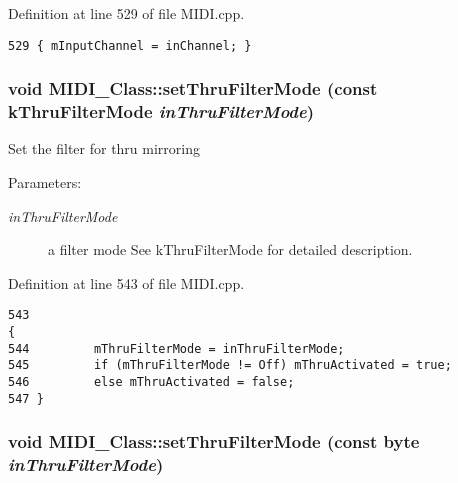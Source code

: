 Definition at line 529 of file MIDI.cpp.

\begin{Code}\begin{verbatim}529 { mInputChannel = inChannel; }
\end{verbatim}
\end{Code}


\hypertarget{class_m_i_d_i___class_33d450180a10a36bef08e68015c4d922}{
\subsubsection[{setThruFilterMode}]{\setlength{\rightskip}{0pt plus 5cm}void MIDI\_\-Class::setThruFilterMode (const {\bf kThruFilterMode} {\em inThruFilterMode})}}
\label{class_m_i_d_i___class_33d450180a10a36bef08e68015c4d922}


Set the filter for thru mirroring \begin{Desc}
\item[Parameters:]
\begin{description}
\item[{\em inThruFilterMode}]a filter mode See kThruFilterMode for detailed description. \end{description}
\end{Desc}


Definition at line 543 of file MIDI.cpp.

\begin{Code}\begin{verbatim}543                                                                    { 
544         mThruFilterMode = inThruFilterMode;
545         if (mThruFilterMode != Off) mThruActivated = true;
546         else mThruActivated = false;
547 }
\end{verbatim}
\end{Code}


\hypertarget{class_m_i_d_i___class_be50e76aa11dc7127bd28659c181ab77}{
\subsubsection[{setThruFilterMode}]{\setlength{\rightskip}{0pt plus 5cm}void MIDI\_\-Class::setThruFilterMode (const byte {\em inThruFilterMode})}}
\label{class_m_i_d_i___class_be50e76aa11dc7127bd28659c181ab77}


